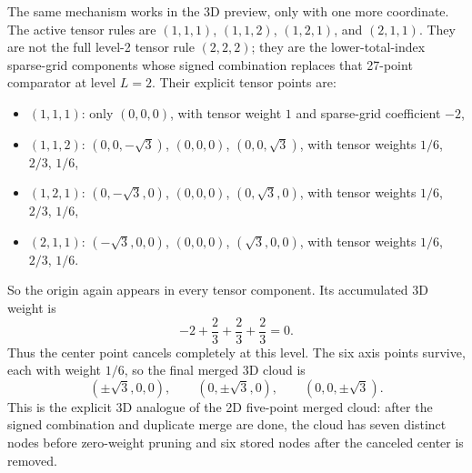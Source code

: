 \documentclass[11pt]{article}
\numberwithin{equation}{section}
\begin{document}
The same mechanism works in the 3D preview, only with one more coordinate.  The
active tensor rules are \((1,1,1)\), \((1,1,2)\), \((1,2,1)\), and \((2,1,1)\).
They are not the full level-2 tensor rule \((2,2,2)\); they are the lower-total-index
sparse-grid components whose signed combination replaces that 27-point comparator
at level \(L=2\).  Their explicit tensor points are:
\begin{itemize}[leftmargin=0.28in]
  \item \((1,1,1)\): only \((0,0,0)\), with tensor weight \(1\) and sparse-grid
  coefficient \(-2\),
  \item \((1,1,2)\): \((0,0,-\sqrt3)\), \((0,0,0)\), \((0,0,\sqrt3)\),
  with tensor weights \(1/6\), \(2/3\), \(1/6\),
  \item \((1,2,1)\): \((0,-\sqrt3,0)\), \((0,0,0)\), \((0,\sqrt3,0)\),
  with tensor weights \(1/6\), \(2/3\), \(1/6\),
  \item \((2,1,1)\): \((-\sqrt3,0,0)\), \((0,0,0)\), \((\sqrt3,0,0)\),
  with tensor weights \(1/6\), \(2/3\), \(1/6\).
\end{itemize}
So the origin again appears in every tensor component.  Its accumulated 3D weight
is
\begin{equation}
  -2 + \frac23 + \frac23 + \frac23 = 0.
  \label{eq:p38-3d-origin-merge}
\end{equation}
Thus the center point cancels completely at this level.  The six axis points
survive, each with weight \(1/6\), so the final merged 3D cloud is
\begin{equation}
  (\pm\sqrt3,0,0),
  \qquad
  (0,\pm\sqrt3,0),
  \qquad
  (0,0,\pm\sqrt3).
  \label{eq:p38-3d-final-merged-cloud}
\end{equation}
This is the explicit 3D analogue of the 2D five-point merged cloud: after the
signed combination and duplicate merge are done, the cloud has seven distinct
nodes before zero-weight pruning and six stored nodes after the canceled center
is removed.
\end{document}
